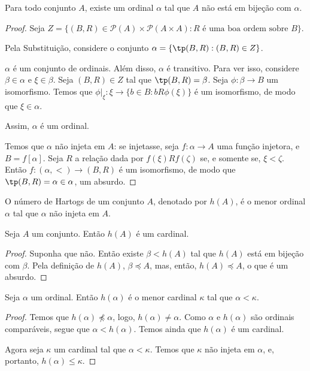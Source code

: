 \begin{proposition}\label{prop:teoremaDeHartogs}
    Para todo conjunto $A$, existe um ordinal $\alpha$ tal que $A$ não está em bijeção com $\alpha$.
\end{proposition}
\begin{proof}
    Seja $Z=\{(B, R) \in \mathcal P(A) \times \mathcal{P}(A\times A) : R \text{ é uma boa ordem sobre } B\}$.
    
    Pela Substituição, considere o conjunto $\alpha=\{\tp(B, R) : (B, R)\in Z\}$.

    $\alpha$ é um conjunto de ordinais.
    Além disso, $\alpha$ é transitivo.
    Para ver isso, considere $\beta\in \alpha$ e $\xi\in \beta$.
    Seja $(B, R)\in Z$ tal que $\tp(B, R)=\beta$.
    Seja $\phi: \beta \to B$ um isomorfismo.
    Temos que $\phi|_\xi: \xi \to \{b \in B: b R \phi(\xi)\}$ é um isomorfismo, de modo que $\xi\in \alpha$.
    
    Assim, $\alpha$ é um ordinal.

    Temos que $\alpha$ não injeta em $A$: se injetasse, seja $f:\alpha \to A$ uma função injetora, e $B=f[\alpha]$.
    Seja $R$ a relação dada por $f(\xi) R f(\zeta)$ se, e somente se, $\xi<\zeta$.
    Então $f:(\alpha, <)\to (B, R)$ é um isomorfismo, de modo que $\tp(B, R)=\alpha\in \alpha$, um absurdo.
\end{proof}

\begin{definition}\label{def:numeroDeHartogs}
    O número de Hartogs de um conjunto $A$, denotado por $h(A)$, é o menor ordinal $\alpha$ tal que $\alpha$ não injeta em $A$.
\end{definition}

\begin{lemma}\label{lem:hartogsEhCardinal}
    Seja $A$ um conjunto.
    Então $h(A)$ é um cardinal.
\end{lemma}
\begin{proof}
    Suponha que não.
    Então existe $\beta<h(A)$ tal que $h(A)$ está em bijeção com $\beta$.
    Pela definição de $h(A)$, $\beta \preceq A$, mas, então, $h(A)\preceq A$, o que é um absurdo.
\end{proof}

\begin{lemma}\label{lem:hartogsEhMenorCardinalMaior}
    Seja $\alpha$ um ordinal.
    Então $h(\alpha)$ é o menor cardinal $\kappa$ tal que $\alpha<\kappa$.
\end{lemma}
\begin{proof}
    Temos que $h(\alpha)\not\preceq \alpha$, logo, $h(\alpha)\neq \alpha$.
    Como $\alpha$ e $h(\alpha)$ são ordinais comparáveis, segue que $\alpha<h(\alpha)$.
    Temos ainda que $h(\alpha)$ é um cardinal.

    Agora seja $\kappa$ um cardinal tal que $\alpha<\kappa$.
    Temos que $\kappa$ não injeta em $\alpha$, e, portanto, $h(\alpha)\leq \kappa$.
\end{proof}

